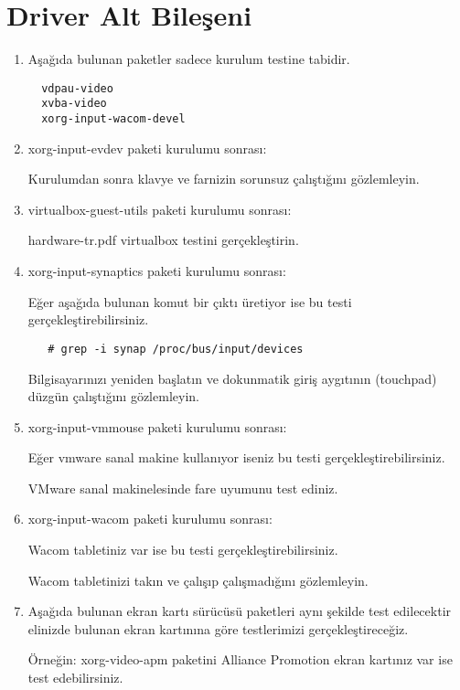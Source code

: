 \documentclass[a4paper,10pt]{article}
\begin{document}
\section{Driver Alt Bileşeni}
\begin{enumerate}
\item Aşağıda bulunan paketler sadece kurulum testine tabidir.
  \begin{verbatim}
  vdpau-video
  xvba-video   
  xorg-input-wacom-devel
  \end{verbatim}

  \item xorg-input-evdev paketi kurulumu sonrası:

Kurulumdan sonra klavye ve farnizin sorunsuz çalıştığını gözlemleyin.

  \item virtualbox-guest-utils paketi kurulumu sonrası:

hardware-tr.pdf virtualbox testini gerçekleştirin.

  \item xorg-input-synaptics  paketi kurulumu sonrası:

Eğer aşağıda bulunan komut bir çıktı üretiyor ise bu testi gerçekleştirebilirsiniz.
  \begin{verbatim}
   # grep -i synap /proc/bus/input/devices
  \end{verbatim}

Bilgisayarınızı yeniden başlatın ve dokunmatik giriş aygıtının (touchpad) düzgün çalıştığını gözlemleyin.

\item xorg-input-vmmouse paketi kurulumu sonrası:

Eğer vmware sanal makine kullanıyor iseniz bu testi gerçekleştirebilirsiniz. 

VMware sanal makinelesinde fare uyumunu test ediniz.

\item xorg-input-wacom paketi kurulumu sonrası:

Wacom tabletiniz var ise bu testi gerçekleştirebilirsiniz.

Wacom tabletinizi takın ve çalışıp çalışmadığını gözlemleyin.

\item Aşağıda bulunan ekran kartı sürücüsü paketleri aynı şekilde test edilecektir elinizde bulunan ekran kartınına göre testlerimizi gerçekleştireceğiz. 

Örneğin: xorg-video-apm paketini Alliance Promotion ekran kartınız var ise test edebilirsiniz.


\end{enumerate}
\end{document}
